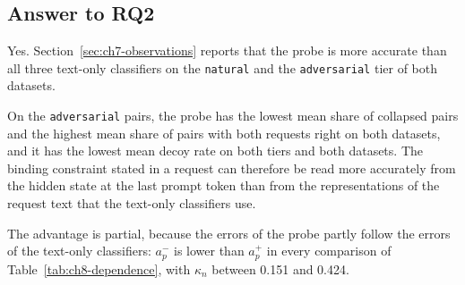 \subsection{Answer to RQ2}
\label{subsec:ch8-rq2-answer}

\label{rq:ch8-rq2}


\noindent Yes. Section~\ref{sec:ch7-observations} reports that the probe is more accurate than all three text-only classifiers on the \texttt{natural} and the \texttt{adversarial} tier of both datasets.

On the \texttt{adversarial} pairs, the probe has the lowest mean share of collapsed pairs and the highest mean share of pairs with both requests right on both datasets, and it has the lowest mean decoy rate on both tiers and both datasets. The binding constraint stated in a request can therefore be read more accurately from the hidden state at the last prompt token than from the representations of the request text that the text-only classifiers use.

The advantage is partial, because the errors of the probe partly follow the errors of the text-only classifiers: $a_p^{-}$ is lower than $a_p^{+}$ in every comparison of Table~\ref{tab:ch8-dependence}, with $\kappa_n$ between 0.151 and 0.424.

\FloatBarrier
